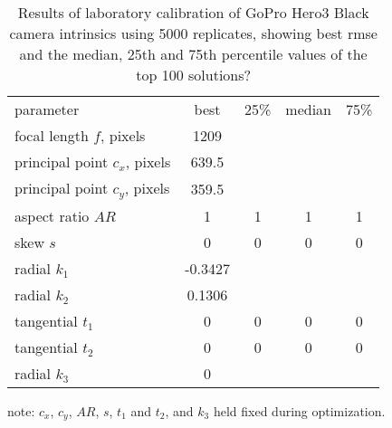 \documentclass[fleqn,10pt]{wlpeerj}
\begin{document}
\begin{table}
\caption{Results of laboratory calibration of GoPro Hero3 Black camera intrinsics using 5000 replicates, showing best rmse and the median, 25th and 75th percentile values of the top 100 solutions? }
\label{tab:labcal2}
\begin{center}
\begin{tabular}{lcccc}
parameter & best & 25\% & median & 75\% \\
\cline{1-5}
focal length $f$, pixels & 1209 & & &\\
principal point $c_x$, pixels & 639.5 & & & \\
principal point $c_y$, pixels & 359.5 & & & \\
aspect ratio $AR$ & 1 & 1 & 1 & 1\\skew $s$ & 0 & 0 & 0 & 0 \\
radial $k_1$ & -0.3427 & & & \\
radial $k_2$ & 0.1306 & & & \\
tangential $t_1$ & 0 & 0 & 0 & 0 \\
tangential $t_2$ & 0 & 0 & 0 & 0 \\
radial $k_3$ & 0 & & & \\
\end{tabular}
\end{center}
note: $c_x$, $c_y$, $AR$, $s$, $t_1$ and $t_2$, and $k_3$ held fixed during optimization.
\end{table}
\end{document}
